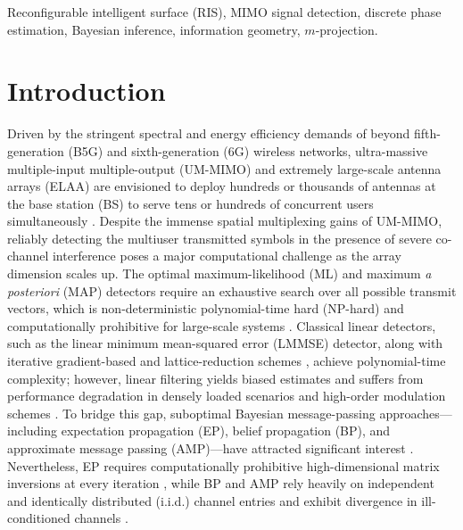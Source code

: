 \documentclass[conference]{IEEEtran}
\begin{document}
\begin{IEEEkeywords}
	Reconfigurable intelligent surface (RIS), MIMO signal detection, discrete phase estimation, Bayesian inference, information geometry, $m$-projection.
\end{IEEEkeywords}

\section{Introduction}
Driven by the stringent spectral and energy efficiency demands of beyond fifth-generation (B5G) and sixth-generation (6G) wireless networks, ultra-massive multiple-input multiple-output (UM-MIMO) and extremely large-scale antenna arrays (ELAA) are envisioned to deploy hundreds or thousands of antennas at the base station (BS) to serve tens or hundreds of concurrent users simultaneously \cite{b2,b3,b4,b5}. Despite the immense spatial multiplexing gains of UM-MIMO, reliably detecting the multiuser transmitted symbols in the presence of severe co-channel interference poses a major computational challenge as the array dimension scales up. The optimal maximum-likelihood (ML) and maximum \textit{a posteriori} (MAP) detectors require an exhaustive search over all possible transmit vectors, which is non-deterministic polynomial-time hard (NP-hard) and computationally prohibitive for large-scale systems \cite{b10}. Classical linear detectors, such as the linear minimum mean-squared error (LMMSE) detector, along with iterative gradient-based and lattice-reduction schemes \cite{b12,b13}, achieve polynomial-time complexity; however, linear filtering yields biased estimates \cite{b10} and suffers from performance degradation in densely loaded scenarios and high-order modulation schemes \cite{b11}. To bridge this gap, suboptimal Bayesian message-passing approaches—including expectation propagation (EP), belief propagation (BP), and approximate message passing (AMP)—have attracted significant interest \cite{b11,b14,b15,b16,b17}. Nevertheless, EP requires computationally prohibitive high-dimensional matrix inversions at every iteration \cite{b11,b15}, while BP and AMP rely heavily on independent and identically distributed (i.i.d.) channel entries and exhibit divergence in ill-conditioned channels \cite{b14,b16,b17}.
\end{document}
